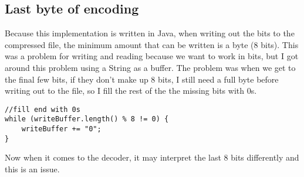 \documentclass{article}
\begin{document}
\subsection{Last byte of encoding}
Because this implementation is written in Java, when writing out the bits to the compressed file, the minimum amount that can be written is a byte (8 bits). This was a problem for writing and reading because we want to work in bits, but I got around this problem using a String as a buffer. The problem was when we get to the final few bits, if they don't make up 8 bits, I still need a full byte before writing out to the file, so I fill the rest of the the missing bits with 0s. 
\begin{lstlisting}
//fill end with 0s
while (writeBuffer.length() % 8 != 0) {
	writeBuffer += "0";
}
\end{lstlisting}
Now when it comes to the decoder, it may interpret the last 8 bits differently and this is an issue. 
\end{document}
